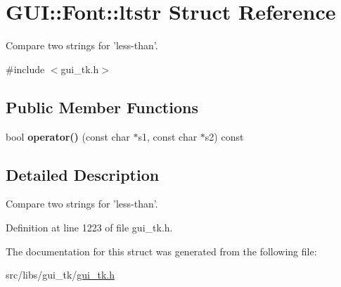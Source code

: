 \hypertarget{structGUI_1_1Font_1_1ltstr}{\section{G\-U\-I\-:\-:Font\-:\-:ltstr Struct Reference}
\label{structGUI_1_1Font_1_1ltstr}
}


Compare two strings for 'less-\/than'.  




{\ttfamily \#include $<$gui\-\_\-tk.\-h$>$}

\subsection*{Public Member Functions}
\begin{DoxyCompactItemize}
\item 
\hypertarget{structGUI_1_1Font_1_1ltstr_ac7c504afcbc1bb5c7d14c84b6fecedc2}{bool {\bfseries operator()} (const char $\ast$s1, const char $\ast$s2) const }\label{structGUI_1_1Font_1_1ltstr_ac7c504afcbc1bb5c7d14c84b6fecedc2}

\end{DoxyCompactItemize}


\subsection{Detailed Description}
Compare two strings for 'less-\/than'. 

Definition at line 1223 of file gui\-\_\-tk.\-h.



The documentation for this struct was generated from the following file\-:\begin{DoxyCompactItemize}
\item 
src/libs/gui\-\_\-tk/\hyperlink{gui__tk_8h}{gui\-\_\-tk.\-h}\end{DoxyCompactItemize}

